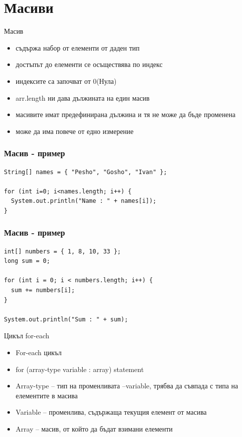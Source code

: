 \documentclass{beamer}
\begin{document}
\section{Масиви}

\begin{frame}{Масив}
  \transdissolve
  \begin{itemize}
    \item съдържа набор от елементи от даден тип \pause
    \item достъпът до елементи се осъществява по индекс \pause
    \item индексите са започват от 0(Нула) \pause
    \item arr.length ни дава дължината на един масив \pause
    \item масивите имат предефинирана дължина и тя не може да бъде
      променена \pause
    \item може да има повече от едно измерение
  \end{itemize}

\end{frame}

\begin{frame}[fragile]
  \frametitle{Масив - пример}
  \transdissolve
\begin{lstlisting}
String[] names = { "Pesho", "Gosho", "Ivan" };

for (int i=0; i<names.length; i++) {
  System.out.println("Name : " + names[i]);
}
\end{lstlisting}
\end{frame}

\begin{frame}[fragile]
  \frametitle{Масив - пример}
  \transdissolve
\begin{lstlisting}
int[] numbers = { 1, 8, 10, 33 };
long sum = 0;

for (int i = 0; i < numbers.length; i++) {
  sum += numbers[i];
}

System.out.println("Sum : " + sum);
\end{lstlisting}
\end{frame}

\begin{frame}{Цикъл for-each}
  \transdissolve
  \begin{itemize}
  \item For-each цикъл
    \item for (array-type variable : array) statement

    \item Array-type – тип на променливата
    –variable, трябва да съвпада с типа на
    елементите в масива
    \item Variable – променлива, съдържаща
    текущия елемент от масива
    \item Array – масив, от който да бъдат
    взимани елементи

  \end{itemize}
\end{frame}
\end{document}
